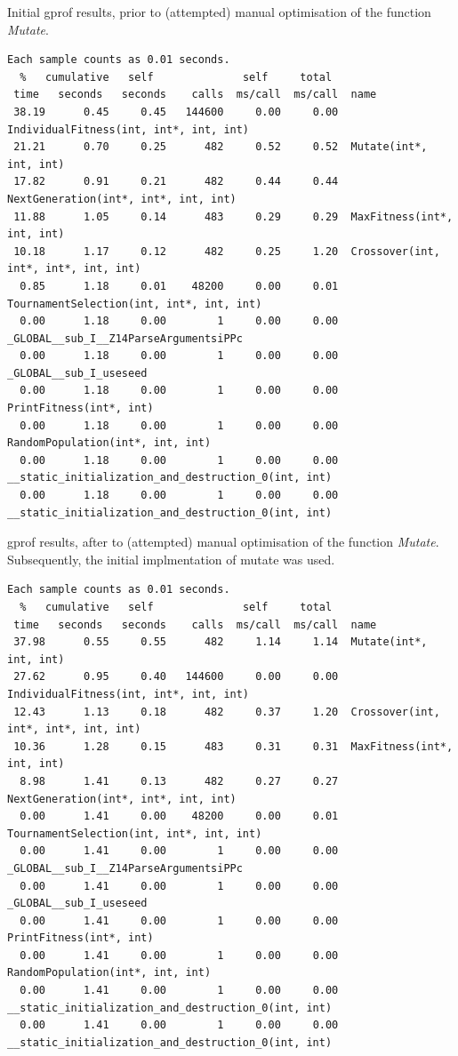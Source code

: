 \documentclass{report}
\begin{document}
Initial gprof results, prior to (attempted) manual optimisation of the function \textit{Mutate}.
\begin{lstlisting}
Each sample counts as 0.01 seconds.
  %   cumulative   self              self     total           
 time   seconds   seconds    calls  ms/call  ms/call  name    
 38.19      0.45     0.45   144600     0.00     0.00  IndividualFitness(int, int*, int, int)
 21.21      0.70     0.25      482     0.52     0.52  Mutate(int*, int, int)
 17.82      0.91     0.21      482     0.44     0.44  NextGeneration(int*, int*, int, int)
 11.88      1.05     0.14      483     0.29     0.29  MaxFitness(int*, int, int)
 10.18      1.17     0.12      482     0.25     1.20  Crossover(int, int*, int*, int, int)
  0.85      1.18     0.01    48200     0.00     0.01  TournamentSelection(int, int*, int, int)
  0.00      1.18     0.00        1     0.00     0.00  _GLOBAL__sub_I__Z14ParseArgumentsiPPc
  0.00      1.18     0.00        1     0.00     0.00  _GLOBAL__sub_I_useseed
  0.00      1.18     0.00        1     0.00     0.00  PrintFitness(int*, int)
  0.00      1.18     0.00        1     0.00     0.00  RandomPopulation(int*, int, int)
  0.00      1.18     0.00        1     0.00     0.00  __static_initialization_and_destruction_0(int, int)
  0.00      1.18     0.00        1     0.00     0.00  __static_initialization_and_destruction_0(int, int)
\end{lstlisting}
gprof results, after to (attempted) manual optimisation of the function \textit{Mutate}. Subsequently, the initial implmentation of mutate was used. 
\begin{lstlisting}
Each sample counts as 0.01 seconds.
  %   cumulative   self              self     total           
 time   seconds   seconds    calls  ms/call  ms/call  name    
 37.98      0.55     0.55      482     1.14     1.14  Mutate(int*, int, int)
 27.62      0.95     0.40   144600     0.00     0.00  IndividualFitness(int, int*, int, int)
 12.43      1.13     0.18      482     0.37     1.20  Crossover(int, int*, int*, int, int)
 10.36      1.28     0.15      483     0.31     0.31  MaxFitness(int*, int, int)
  8.98      1.41     0.13      482     0.27     0.27  NextGeneration(int*, int*, int, int)
  0.00      1.41     0.00    48200     0.00     0.01  TournamentSelection(int, int*, int, int)
  0.00      1.41     0.00        1     0.00     0.00  _GLOBAL__sub_I__Z14ParseArgumentsiPPc
  0.00      1.41     0.00        1     0.00     0.00  _GLOBAL__sub_I_useseed
  0.00      1.41     0.00        1     0.00     0.00  PrintFitness(int*, int)
  0.00      1.41     0.00        1     0.00     0.00  RandomPopulation(int*, int, int)
  0.00      1.41     0.00        1     0.00     0.00  __static_initialization_and_destruction_0(int, int)
  0.00      1.41     0.00        1     0.00     0.00  __static_initialization_and_destruction_0(int, int)
\end{lstlisting}
\end{document}
